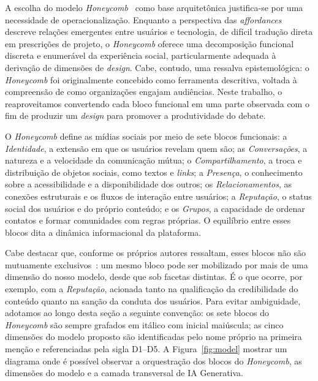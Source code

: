 \documentclass[conference]{IEEEtran} \IEEEoverridecommandlockouts %
\begin{document}
A escolha do modelo \textit{Honeycomb}~\cite{kietzmannSocialMediaGet2011} como base arquitetônica justifica-se por uma necessidade de operacionalização. Enquanto a perspectiva das \textit{affordances} descreve relações emergentes entre usuários e tecnologia, de difícil tradução direta em prescrições de projeto, o \textit{Honeycomb} oferece uma decomposição funcional discreta e enumerável da experiência social, particularmente adequada à derivação de dimensões de \textit{design}. Cabe, contudo, uma ressalva epistemológica: o \textit{Honeycomb} foi originalmente concebido como ferramenta descritiva, voltada à compreensão de como organizações engajam audiências. Neste trabalho, o reaproveitamos convertendo cada bloco funcional em uma parte observada com o fim de produzir um \textit{design} para promover a produtividade do debate.

O \textit{Honeycomb} define as mídias sociais por meio de sete blocos funcionais: a \textit{Identidade}, a extensão em que os usuários revelam quem são; as \textit{Conversações}, a natureza e a velocidade da comunicação mútua; o \textit{Compartilhamento}, a troca e distribuição de objetos sociais, como textos e \textit{links}; a \textit{Presença}, o conhecimento sobre a acessibilidade e a disponibilidade dos outros; os \textit{Relacionamentos}, as conexões estruturais e os fluxos de interação entre usuários; a \textit{Reputação}, o status social dos usuários e do próprio conteúdo; e os \textit{Grupos}, a capacidade de ordenar contatos e formar comunidades com regras próprias. O equilíbrio entre esses blocos dita a dinâmica informacional da plataforma.

Cabe destacar que, conforme os próprios autores ressaltam, esses blocos não são mutuamente exclusivos~\cite{kietzmannSocialMediaGet2011}: um mesmo bloco pode ser mobilizado por mais de uma dimensão do nosso modelo, desde que sob facetas distintas. É o que ocorre, por exemplo, com a \textit{Reputação}, acionada tanto na qualificação da credibilidade do conteúdo quanto na sanção da conduta dos usuários. Para evitar ambiguidade, adotamos ao longo desta seção a seguinte convenção: os sete blocos do \textit{Honeycomb} são sempre grafados em itálico com inicial maiúscula; as cinco dimensões do modelo proposto são identificadas pelo nome próprio na primeira menção e referenciadas pela sigla D1--D5. A Figura~\ref{fig:model} mostrar um diagrama onde é possível observar a orquestração dos blocos do \textit{Honeycomb}, as dimensões do modelo e a camada transversal de IA Generativa.
\end{document}
